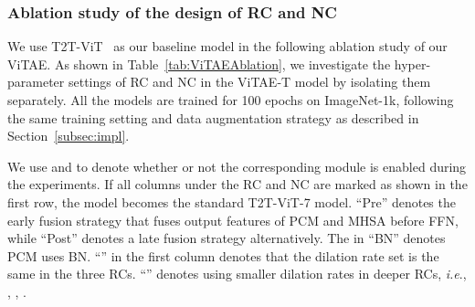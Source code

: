\documentclass[twocolumn]{svjour3}          \smartqed  \usepackage{natbib}
\newcommand{\ie}{i.e}
\def\onedot{.\xspace}
\def\ie{\emph{i.e}\onedot}
\begin{document}
\subsubsection{Ablation study of the design of RC and NC}
We use T2T-ViT~\citep{yuan2021tokens} as our baseline model in the following ablation study of our ViTAE. As shown in Table~\ref{tab:ViTAEAblation}, we investigate the hyper-parameter settings of RC and NC in the ViTAE-T model by isolating them separately. All the models are trained for 100 epochs on ImageNet-1k, following the same training setting and data augmentation strategy as described in Section~\ref{subsec:impl}.

We use  and  to denote whether or not the corresponding module is enabled during the experiments. If all columns under the RC and NC are marked  as shown in the first row, the model becomes the standard T2T-ViT-7 model. ``Pre'' denotes the early fusion strategy that fuses output features of PCM and MHSA before FFN, while ``Post'' denotes a late fusion strategy alternatively. The \checkmark in ``BN'' denotes PCM uses BN. ``'' in the first column denotes that the dilation rate set is the same in the three RCs. ``'' denotes using smaller dilation rates in deeper RCs, \ie, , , .
\end{document}
